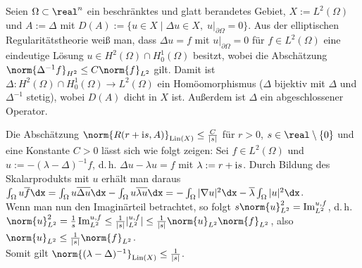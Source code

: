 \linie

\begin{Bsp}
    Seien $\Omega \subset \real^n$ ein beschränktes und glatt berandetes Gebiet,
    $X := L^2(\Omega)$ und $A := \Delta$ mit
    $D(A) := \{u \in X \;|\; \Delta u \in X,\; u|_{\partial\Omega} = 0\}$.
    Aus der elliptischen Regularitätstheorie weiß man, dass $\Delta u = f$ mit
    $u|_{\partial\Omega} = 0$ für $f \in L^2(\Omega)$ eine eindeutige Lösung
    $u \in H^2(\Omega) \cap H^1_0(\Omega)$ besitzt,
    wobei die Abschätzung $\norm{\Delta^{-1} f}_{H^2} \le C \norm{f}_{L^2}$ gilt.
    Damit ist $\Delta\colon H^2(\Omega) \cap H^1_0(\Omega) \to L^2(\Omega)$ ein
    Homöomorphismus ($\Delta$ bijektiv mit $\Delta$ und $\Delta^{-1}$ stetig),
    wobei $D(A)$ dicht in $X$ ist.
    Außerdem ist $\Delta$ ein abgeschlossener Operator.
    
    Die Abschätzung $\norm{R(r + \iu s, A)}_{\Lin(X)} \le \frac{C}{|s|}$
    für $r > 0$, $s \in \real \setminus \{0\}$ und eine Konstante $C > 0$
    lässt sich wie folgt zeigen:
    Sei $f \in L^2(\Omega)$ und $u := -(\lambda - \Delta)^{-1} f$, d.\,h.
    $\Delta u - \lambda u = f$ mit $\lambda := r + \mathrm{i} s$.
    Durch Bildung des Skalarprodukts mit $u$ erhält man daraus\\
    $\int_\Omega u \overline{f} \dx
    = \int_\Omega u \overline{\Delta u} \dx - \int_\Omega u \overline{\lambda u} \dx
    = -\int_\Omega |\nabla u|^2 \dx - \overline{\lambda} \int_\Omega |u|^2 \dx$.\\
    Wenn man nun den Imaginärteil betrachtet, so folgt
    $s \norm{u}_{L^2}^2 = \Im \sp{u, f}_{L^2}$, d.\,h.\\
    $\norm{u}_{L^2}^2 = \frac{1}{s} \Im \sp{u, f}_{L^2}
    \le \frac{1}{|s|} |\sp{u, f}_{L^2}|
    \le \frac{1}{|s|} \norm{u}_{L^2} \norm{f}_{L^2}$, also
    $\norm{u}_{L^2} \le \frac{1}{|s|} \norm{f}_{L^2}$.\\
    Somit gilt $\norm{(\lambda - \Delta)^{-1}}_{\Lin(X)} \le \frac{1}{|s|}$.
\end{Bsp}

\pagebreak
